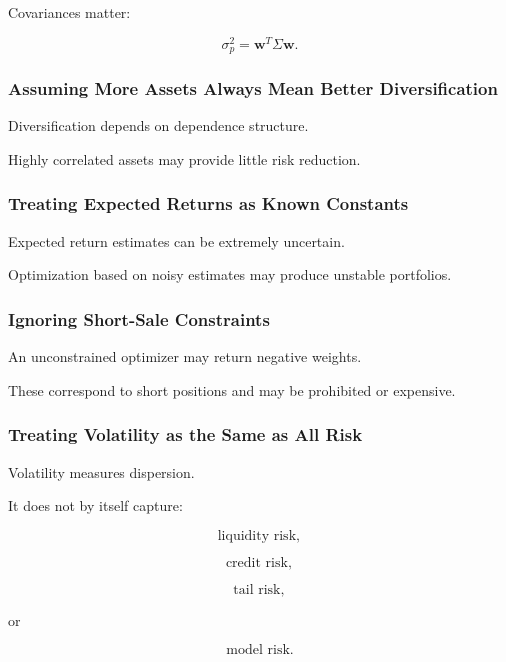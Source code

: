 Covariances matter:

\[
\boxed{
\sigma_p^2
=
\mathbf{w}^T
\Sigma
\mathbf{w}.
}
\]

\subsubsection{Assuming More Assets Always Mean Better Diversification}

Diversification depends on dependence structure.

Highly correlated assets may provide little risk reduction.

\subsubsection{Treating Expected Returns as Known Constants}

Expected return estimates can be extremely uncertain.

Optimization based on noisy estimates may produce unstable portfolios.

\subsubsection{Ignoring Short-Sale Constraints}

An unconstrained optimizer may return negative weights.

These correspond to short positions and may be prohibited or expensive.

\subsubsection{Treating Volatility as the Same as All Risk}

Volatility measures dispersion.

It does not by itself capture:

\[
\boxed{
\text{liquidity risk},
}
\]

\[
\boxed{
\text{credit risk},
}
\]

\[
\boxed{
\text{tail risk},
}
\]

or

\[
\boxed{
\text{model risk}.
}
\]


